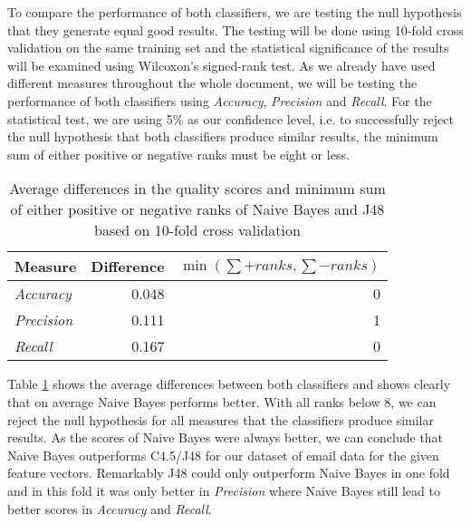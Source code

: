 To compare the performance of both classifiers, we are testing the null hypothesis that they generate equal good results.
The testing will be done using 10-fold cross validation on the same training set and the statistical significance of the results will be examined using Wilcoxon's signed-rank test.
As we already have used different measures throughout the whole document, we will be testing the performance of both classifiers using \emph{Accuracy}, \emph{Precision} and \emph{Recall}.
For the statistical test, we are using 5\% as our confidence level, i.e. to successfully reject the null hypothesis that both classifiers produce similar results, the minimum sum of either positive or negative ranks must be eight or less.

\begin{table}[h!]
    \centering
    \begin{tabular}{ | l | r | r | }
        \hline
        \textbf{Measure} & \textbf{Difference} & $\min(\sum +ranks, \sum -ranks)$ \\
        \hline
        \emph{Accuracy} & 0.048 & 0 \\
        \hline
        \emph{Precision} & 0.111 & 1 \\
        \hline
        \emph{Recall} & 0.167 & 0 \\
        \hline
    \end{tabular}
    \caption{Average differences in the quality scores and minimum sum of either positive or negative ranks of Naive Bayes and J48 based on 10-fold cross validation}
    \label{table:difference}
\end{table}

Table \ref{table:difference} shows the average differences between both classifiers and shows clearly that on average Naive Bayes performs better.
With all ranks below $8$, we can reject the null hypothesis for all measures that the classifiers produce similar results.
As the scores of Naive Bayes were always better, we can conclude that Naive Bayes outperforms C4.5/J48 for our dataset of email data for the given feature vectors.
Remarkably J48 could only outperform Naive Bayes in one fold and in this fold it was only better in \emph{Precision} where Naive Bayes still lead to better scores in \emph{Accuracy} and \emph{Recall}.

